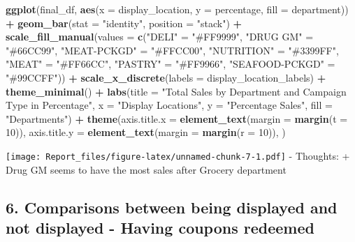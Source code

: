 \documentclass[
]{article}
\newenvironment{Shaded}{\begin{snugshade}}{\end{snugshade}}
\newcommand{\AttributeTok}[1]{\textcolor[rgb]{0.13,0.29,0.53}{#1}}
\newcommand{\DecValTok}[1]{\textcolor[rgb]{0.00,0.00,0.81}{#1}}
\newcommand{\FunctionTok}[1]{\textcolor[rgb]{0.13,0.29,0.53}{\textbf{#1}}}
\newcommand{\NormalTok}[1]{#1}
\newcommand{\OtherTok}[1]{\textcolor[rgb]{0.56,0.35,0.01}{#1}}
\newcommand{\SpecialCharTok}[1]{\textcolor[rgb]{0.81,0.36,0.00}{\textbf{#1}}}
\newcommand{\StringTok}[1]{\textcolor[rgb]{0.31,0.60,0.02}{#1}}
\begin{document}
\begin{Shaded}
\begin{Highlighting}[]
\FunctionTok{ggplot}\NormalTok{(final\_df, }\FunctionTok{aes}\NormalTok{(}\AttributeTok{x =}\NormalTok{ display\_location, }\AttributeTok{y =}\NormalTok{ percentage, }\AttributeTok{fill =}\NormalTok{ department)) }\SpecialCharTok{+}
  \FunctionTok{geom\_bar}\NormalTok{(}\AttributeTok{stat =} \StringTok{"identity"}\NormalTok{, }\AttributeTok{position =} \StringTok{"stack"}\NormalTok{) }\SpecialCharTok{+}
  \FunctionTok{scale\_fill\_manual}\NormalTok{(}\AttributeTok{values =} \FunctionTok{c}\NormalTok{(}\StringTok{"DELI"} \OtherTok{=} \StringTok{"\#FF9999"}\NormalTok{, }
                               \StringTok{"DRUG GM"} \OtherTok{=} \StringTok{"\#66CC99"}\NormalTok{, }
                               \StringTok{"MEAT{-}PCKGD"} \OtherTok{=} \StringTok{"\#FFCC00"}\NormalTok{, }
                               \StringTok{"NUTRITION"} \OtherTok{=} \StringTok{"\#3399FF"}\NormalTok{, }
                               \StringTok{"MEAT"} \OtherTok{=} \StringTok{"\#FF66CC"}\NormalTok{, }
                               \StringTok{"PASTRY"} \OtherTok{=} \StringTok{"\#FF9966"}\NormalTok{, }
                               \StringTok{"SEAFOOD{-}PCKGD"} \OtherTok{=} \StringTok{"\#99CCFF"}\NormalTok{)) }\SpecialCharTok{+}
  \FunctionTok{scale\_x\_discrete}\NormalTok{(}\AttributeTok{labels =}\NormalTok{ display\_location\_labels) }\SpecialCharTok{+}
  \FunctionTok{theme\_minimal}\NormalTok{() }\SpecialCharTok{+}
  \FunctionTok{labs}\NormalTok{(}\AttributeTok{title =} \StringTok{"Total Sales by Department and Campaign Type in Percentage"}\NormalTok{,}
       \AttributeTok{x =} \StringTok{"Display Locations"}\NormalTok{,}
       \AttributeTok{y =} \StringTok{"Percentage Sales"}\NormalTok{,}
       \AttributeTok{fill =} \StringTok{"Departments"}\NormalTok{) }\SpecialCharTok{+}
  \FunctionTok{theme}\NormalTok{(}\AttributeTok{axis.title.x =} \FunctionTok{element\_text}\NormalTok{(}\AttributeTok{margin =} \FunctionTok{margin}\NormalTok{(}\AttributeTok{t =} \DecValTok{10}\NormalTok{)),}
        \AttributeTok{axis.title.y =} \FunctionTok{element\_text}\NormalTok{(}\AttributeTok{margin =} \FunctionTok{margin}\NormalTok{(}\AttributeTok{r =} \DecValTok{10}\NormalTok{)),}
\NormalTok{)}
\end{Highlighting}
\end{Shaded}

\texttt{[image: Report\_files/figure-latex/unnamed-chunk-7-1.pdf]} -
Thoughts: + Drug GM seems to have the most sales after Grocery
department

\hypertarget{comparisons-between-being-displayed-and-not-displayed---having-coupons-redeemed}{%
\subsection{6. Comparisons between being displayed and not displayed -
Having coupons
redeemed}\label{comparisons-between-being-displayed-and-not-displayed---having-coupons-redeemed}}
\end{document}
